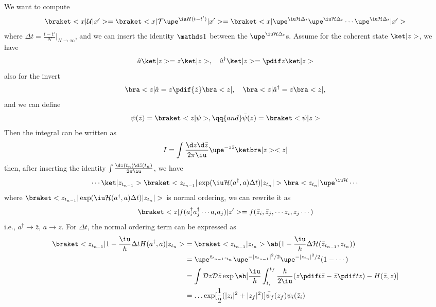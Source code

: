 We want to compute
\begin{equation}
  \braket<x|\mathcal U|x'>  = \braket<x| \mathcal T \upe^{\iu H(t - t')}|x'>
= \braket<x|\upe^{\iu\mathcal H\Delta_t} \upe^{\iu\mathcal H\Delta_t} \cdots \upe^{\iu\mathcal H\Delta_t}|x'>
\end{equation}
where $\Delta t = \frac{t - t'}{N}\big|_{N\to\infty}$,
and we can insert the identity $\identity$
between the $\upe^{\iu\mathcal H\Delta_t}$s.
Assume for the coherent state $\ket|z>$, we have
\[
  \hat a \ket|z> = z \ket|z>, \quad
  \hat a^\dagger \ket|z> = \pdif z \ket|z>
\]
also for the invert
\[
  \bra<z| \hat a = z \pdif{\bar z} \bra<z|, \quad
  \bra<z| \hat a^\dagger = z \bra<z|,
\]
and we can define
\begin{equation}
  \psi(\bar z) = \braket<z|\psi>, \qq{and}
  \bar \psi(z) = \braket<\psi|z>
\end{equation}
Then the integral can be written as
\begin{equation}
  I = \int \frac{\d z \d \bar z}{2\pi\iu} \upe^{-z\bar z} \ketbra|z><z|
\end{equation}
then, after inserting the identity $\int \frac{\d z(t_n) \d \bar z(t_n)}{2\pi\iu}$, we have
\[
  \cdots \ket|z_{t_{n-1}}>\braket<z_{t_{n-1}}|\exp(\iu\mathcal H(a^\dagger,a)\Delta t)|z_{t_n}|>\bra<z_{t_n}| \upe^{\iu\mathcal H} \cdots
\]
where $\braket<z_{t_{n-1}}|\exp(\iu\mathcal H(a^\dagger,a)\Delta t)|z_{t_n}|>$ is normal ordering, we can rewrite it as
\[
  \braket<z|f(a_i^\dagger a_j^\dagger \cdots a_i a_j)|z'>
= f(\bar z_i, \bar z_j, \cdots z_i, z_j \cdots)
\]
i.e., $a^\dagger \to \bar z$, $a \to z$.
For $\Delta t$, the normal ordering term can be expressed as
\begin{equation}
  \begin{aligned}
    \braket<z_{t_{n-1}}|1 - \frac\iu\hbar \Delta t H(a^\dagger,a)|z_{t_n}>
& = \braket<z_{t_{n-1}}|z_{t_n}>\ab(1 - \frac\iu\hbar \Delta
    \mathcal H(\bar z_{t_{n-1}}, z_{t_n}))\\
& = \upe^{\bar z_{t_{n-1} z_{t_n}}}
    \upe^{-|z_{t_{n-1}}|^2/2} \upe^{-|z_{t_n}|^2/2} (1 - \cdots)\\
& = \int \mathcal D z \mathcal D\bar z
    \exp\ab[\frac\iu\hbar \int_{t_i}^{t_f} \frac\hbar{2\iu} (z\pdif t\bar z - \bar z\pdif t z) - H(\bar z, z)]\\
& = \ldots \exp[\frac12 (|z_i|^2 + |z_f|^2)] \bar \psi_f(z_f) \psi_i(\bar z_i)
  \end{aligned}
\end{equation}

